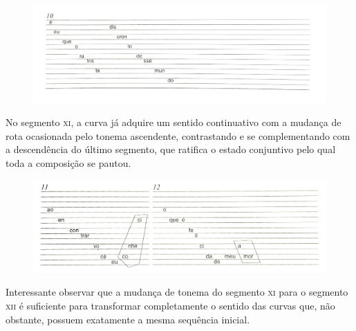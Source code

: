 \begin{figure}[H]
\includegraphics[width=\textwidth]{./imgs/figura12.jpg}
\end{figure}

No segmento \textsc{xi}, a curva já adquire um sentido continuativo com a mudança
de rota ocasionada pelo tonema ascendente, contrastando e se
complementando com a descendência do último segmento, que ratifica o
estado conjuntivo pelo qual toda a composição se pautou.

\begin{figure}[H]
\includegraphics[width=\textwidth]{./imgs/figura13.jpg}
\end{figure}

Interessante observar que a mudança de tonema do segmento \textsc{xi} para o
segmento \textsc{xii} é suficiente para transformar completamente o sentido das
curvas que, não obstante, possuem exatamente a mesma sequência inicial.

